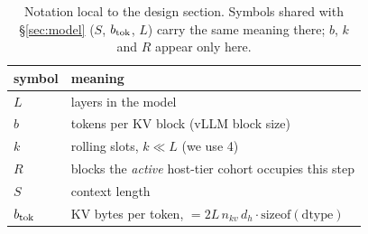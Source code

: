 

\begin{table}[t]
\centering
\small
\begin{tabular}{ll}
\toprule
symbol & meaning \\
\midrule
$L$ & layers in the model \\
$b$ & tokens per KV block (vLLM block size) \\
$k$ & rolling slots, $k \ll L$ (we use 4) \\
$R$ & blocks the \emph{active} host-tier cohort occupies this step \\
$S$ & context length \\
$b_{\mathrm{tok}}$ & KV bytes per token, $= 2 L\,n_{kv}\,d_h \cdot \mathrm{sizeof(dtype)}$ \\
\bottomrule
\end{tabular}
\caption{Notation local to the design section. Symbols shared with \S\ref{sec:model} ($S$, $b_{\mathrm{tok}}$, $L$) carry the same meaning there; $b$, $k$ and $R$ appear only here.}
\label{tab:notation}
\end{table}


